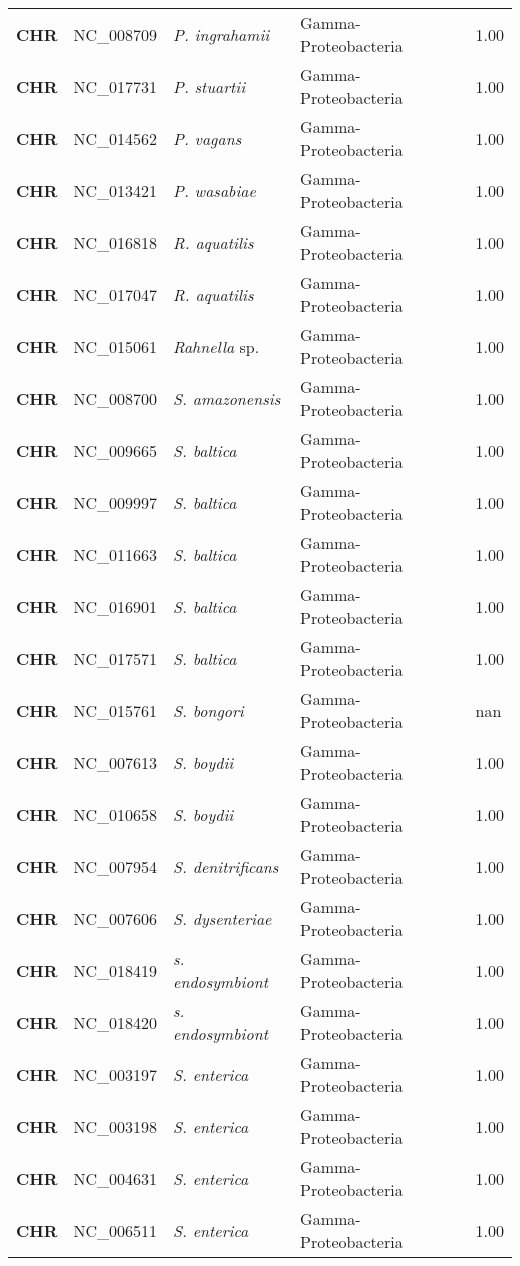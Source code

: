 \begin{adjustwidth}{-3cm}{2cm}
{\begin{supertabular}{>{\bfseries}l|p{0.1\textwidth}p{0.14\textwidth}l|l}
CHR & NC\_008709 & \textit{P. ingrahamii} & Gamma-Proteobacteria & 1.00\\
CHR & NC\_017731 & \textit{P. stuartii} & Gamma-Proteobacteria & 1.00\\
CHR & NC\_014562 & \textit{P. vagans} & Gamma-Proteobacteria & 1.00\\
CHR & NC\_013421 & \textit{P. wasabiae} & Gamma-Proteobacteria & 1.00\\
CHR & NC\_016818 & \textit{R. aquatilis} & Gamma-Proteobacteria & 1.00\\
CHR & NC\_017047 & \textit{R. aquatilis} & Gamma-Proteobacteria & 1.00\\
CHR & NC\_015061 & \textit{Rahnella} sp. & Gamma-Proteobacteria & 1.00\\
CHR & NC\_008700 & \textit{S. amazonensis} & Gamma-Proteobacteria & 1.00\\
CHR & NC\_009665 & \textit{S. baltica} & Gamma-Proteobacteria & 1.00\\
CHR & NC\_009997 & \textit{S. baltica} & Gamma-Proteobacteria & 1.00\\
CHR & NC\_011663 & \textit{S. baltica} & Gamma-Proteobacteria & 1.00\\
CHR & NC\_016901 & \textit{S. baltica} & Gamma-Proteobacteria & 1.00\\
CHR & NC\_017571 & \textit{S. baltica} & Gamma-Proteobacteria & 1.00\\
CHR & NC\_015761 & \textit{S. bongori} & Gamma-Proteobacteria & nan\\
CHR & NC\_007613 & \textit{S. boydii} & Gamma-Proteobacteria & 1.00\\
CHR & NC\_010658 & \textit{S. boydii} & Gamma-Proteobacteria & 1.00\\
CHR & NC\_007954 & \textit{S. denitrificans} & Gamma-Proteobacteria & 1.00\\
CHR & NC\_007606 & \textit{S. dysenteriae} & Gamma-Proteobacteria & 1.00\\
CHR & NC\_018419 & \textit{s. endosymbiont} & Gamma-Proteobacteria & 1.00\\
CHR & NC\_018420 & \textit{s. endosymbiont} & Gamma-Proteobacteria & 1.00\\
CHR & NC\_003197 & \textit{S. enterica} & Gamma-Proteobacteria & 1.00\\
CHR & NC\_003198 & \textit{S. enterica} & Gamma-Proteobacteria & 1.00\\
CHR & NC\_004631 & \textit{S. enterica} & Gamma-Proteobacteria & 1.00\\
CHR & NC\_006511 & \textit{S. enterica} & Gamma-Proteobacteria & 1.00\\

\end{supertabular}}
\end{adjustwidth}
